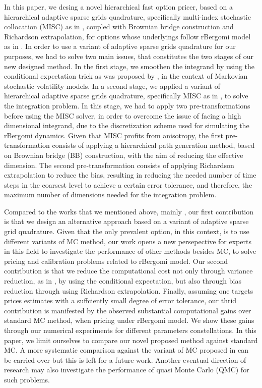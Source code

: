 In this paper,  we desing a novel hierarchical fast option pricer,  based on a  hierarchical adaptive sparse grids quadrature, specifically  multi-index stochastic collocation (MISC) as in  \cite{haji2016multi}, coupled with Brownian bridge construction and Richardson extrapolation, for options whose underlyings  follow rBergomi model as in \cite{bayer2016pricing}.  In order to use a  variant of adaptive sparse grids quadrature for our purposes, we had to solve two main issues, that constitutes the two stages of our new designed method. In the first stage, we smoothen the integrand by using the conditional expectation trick as was proposed by \cite{romano1997contingent}, in the context of Markovian stochastic volatility  models.   In a second stage, we applied a variant of hierarchical adaptive sparse grids quadrature, specifically MISC as in \cite{haji2016multi}, to solve the integration problem. In this stage, we had to apply two pre-transformations before using the MISC solver, in order to overcome the issue of facing a high dimensional integrand, due to the discretization scheme used for simulating the rBergomi dynamics. Given that MISC profits from anisotropy, the first pre-transformation consists of applying a hierarchical  path generation method, based on Brownian
bridge (BB) construction, with the aim of reducing the effective dimension. The second pre-transformation consists of applying Richardson extrapolation to reduce the bias, resulting in reducing the needed number of time steps in the coarsest level to achieve a certain error tolerance, and therefore,  the maximum number of dimensions needed for the integration problem.

Compared to the works that we mentioned above, mainly \cite{mccrickerd2017turbocharging}, our first contribution is that we design an alternative approach based on a variant of adaptive sparse grid quadrature. Given that the only prevalent option, in this context, is to use different variants of MC method, our work opens a new persepective for experts in this field to investigate the performance of other methods besides MC, to solve pricing and calibration problems related to rBergomi model. Our second contribution is that we reduce the computational cost not only through variance reduction, as in  \cite{mccrickerd2017turbocharging}, by using the conditional expectation, but also through bias reduction through using Richardson extrapolation. Finally, assuming one targets prices estimates with a suffciently small degree of error tolerance, our thrid contribution is manifested by the observed substantial computational gains  over standard MC method, when pricing under rBergomi model. We show  these gains through our numerical experiments for  different parameters constellations. In this paper, we limit ourselves to compare our novel proposed method against standard MC. A more systematic comparison against the variant of MC proposed in \cite{mccrickerd2017turbocharging}  can be carried over but this is left for a future work. Another eventual direction of research may also investigate the performance of quasi Monte Carlo (QMC) for such problems.


